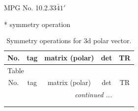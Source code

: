 \documentclass[fleqn,8pt]{jsarticle}
\begin{document}
\setcounter{MaxMatrixCols}{32}

\renewcommand{\tablename}{Table~}
\renewcommand{\figurename}{Figure~}
\begin{center}
\LARGE
MPG No. 10.2.33\quad$\bar{4}1'$
\end{center}
* symmetry operation
\renewcommand{\arraystretch}{1.3}
\begin{longtable}{ccccc}
\caption{Symmetry operations for 3d polar vector.}
 \\
 \hline \hline
No. & tag & matrix (polar) & det & TR \\ \hline \endfirsthead

\multicolumn{4}{l}{\tablename\ \thetable{}} \\
 \hline \hline
No. & tag & matrix (polar) & det & TR \\ \hline \endhead

 \hline \hline
\multicolumn{4}{r}{\footnotesize\it continued ...} \\ \endfoot

 \hline \hline
\multicolumn{4}{r}{} \\ \endlastfoot


\end{longtable}
\end{document}
